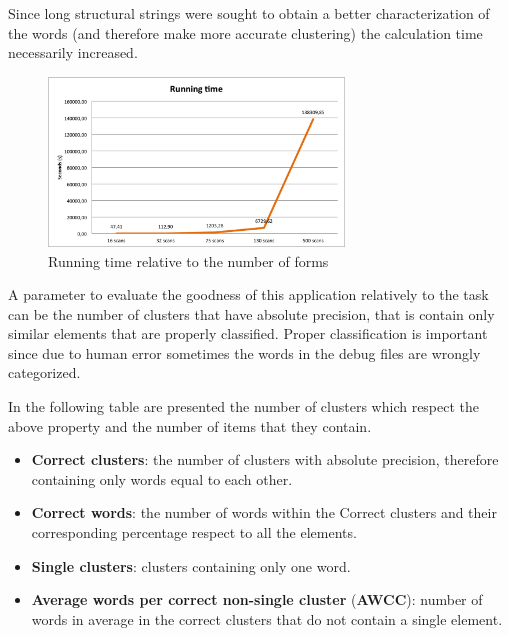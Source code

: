 Since long structural strings were sought to obtain a better characterization of the words (and therefore make more accurate clustering) the calculation time necessarily increased.

\begin{figure}[!htbp]
\centering
\includegraphics[width=0.7\textwidth]{images/esecuzione}
\caption{Running time relative to the number of forms}
\label{fig:time}
\end{figure}

A parameter to evaluate the goodness of this application relatively to the task can be the number of clusters that have absolute precision, that is contain only similar elements that are properly classified. Proper classification is important since due to human error sometimes the words in the debug files are wrongly categorized.

In the following table are presented the number of clusters which respect the above property and the number of items that they contain. 

\begin{itemize}

\item \textbf{Correct clusters}: the number of clusters with absolute precision, therefore containing only words equal to each other.
\item \textbf{Correct words}: the number of words within the Correct clusters and their corresponding percentage respect to all the elements.
\item \textbf{Single clusters}: clusters containing only one word.
\item \textbf{Average words per correct non-single cluster} (\textbf{AWCC}): number of words in average in the correct clusters that do not contain a single element.
\end{itemize}

